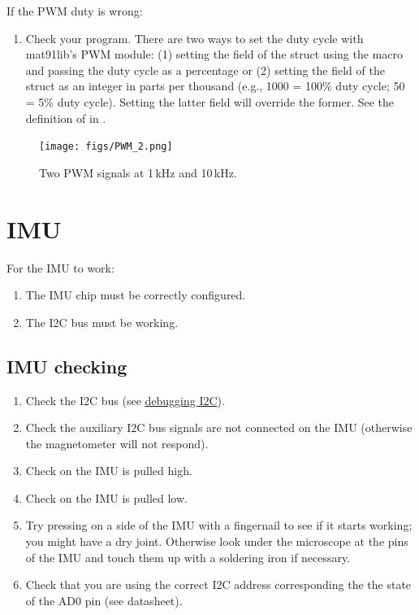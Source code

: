 If the PWM duty is wrong:

\begin{enumerate}
\item
  Check your program. There are two ways to set the duty cycle with
  mat91lib's PWM module: (1) setting the  field of the
   struct using the  macro and
  passing the duty cycle as a percentage or (2) setting the
   field of the  struct as an integer
  in parts per thousand (e.g., 1000 = 100\% duty cycle; 50 = 5\% duty
  cycle). Setting the latter field will override the former. See the
  definition of  in .
\end{enumerate}

\begin{figure}[!h]
\centering
\texttt{[image: figs/PWM\_2.png]}
\caption{Two PWM signals at 1\,kHz and 10\,kHz.}
\end{figure}


\section{IMU}
\label{imu}

For the IMU to work:
%
\begin{enumerate}
\item The IMU chip must be correctly configured.
\item The I2C bus must be working.
\end{enumerate}


\subsection{IMU checking}
\label{checking-IMU}

\begin{enumerate}
\item Check the I2C bus (see \hyperref[debugging-i2c]{debugging I2C}).
\item Check the auxiliary I2C bus signals are not connected on the IMU
  (otherwise the magnetometer will not respond).
\item Check  on the IMU is pulled high.
\item Check  on the IMU is pulled low.
\item Try pressing on a side of the IMU with a fingernail to see if it
  starts working; you might have a dry joint.  Otherwise look under
  the microscope at the pins of the IMU and touch them up with a
  soldering iron if necessary.
\item Check that you are using the correct I2C address corresponding
the the state of the AD0 pin (see datasheet).
\end{enumerate}


